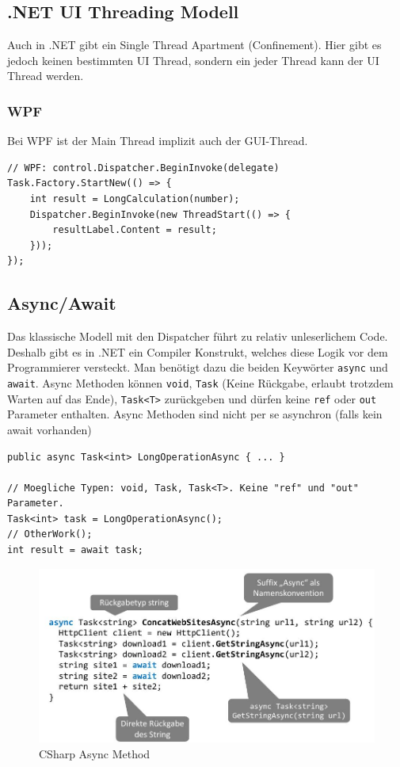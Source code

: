 \subsection{.NET UI Threading Modell}
Auch in .NET gibt ein Single Thread Apartment (Confinement). Hier gibt es jedoch keinen bestimmten UI Thread, sondern ein jeder Thread kann der UI Thread werden.

\subsubsection{WPF}
Bei WPF ist der Main Thread implizit auch der GUI-Thread.

\begin{lstlisting}
// WPF: control.Dispatcher.BeginInvoke(delegate)
Task.Factory.StartNew(() => {
	int result = LongCalculation(number);
	Dispatcher.BeginInvoke(new ThreadStart(() => {
		resultLabel.Content = result;
	}));
});
\end{lstlisting}

\subsection{Async/Await}
Das klassische Modell mit den Dispatcher führt zu relativ unleserlichem Code. Deshalb gibt es in .NET ein Compiler Konstrukt, welches diese Logik vor dem Programmierer versteckt. Man benötigt dazu die beiden Keywörter \lstinline|async| und \lstinline|await|. Async Methoden können \lstinline|void|, \lstinline|Task| (Keine Rückgabe, erlaubt trotzdem Warten auf das Ende), \lstinline|Task<T>| zurückgeben und dürfen keine \lstinline|ref| oder \lstinline|out| Parameter enthalten. Async Methoden sind nicht per se asynchron (falls kein await vorhanden)

\begin{lstlisting}[language={[Sharp]C}]
public async Task<int> LongOperationAsync { ... }

// Moegliche Typen: void, Task, Task<T>. Keine "ref" und "out" Parameter.
Task<int> task = LongOperationAsync();
// OtherWork();
int result = await task;

\end{lstlisting}

\begin{figure}[h]
	\centering
	\includegraphics[width=0.7\linewidth]{img/csharp_async_method}
	\caption{CSharp Async Method}
	\label{fig:csharpasyncmethod}
\end{figure}

